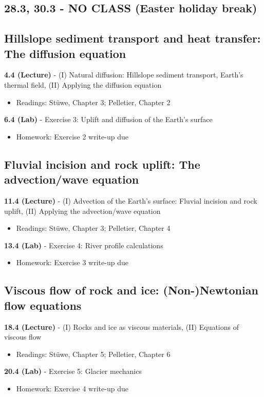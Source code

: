 \documentclass[11pt,a4paper]{article}
\begin{document}
\subsection*{28.3, 30.3 - NO CLASS (Easter holiday break)}

\subsection*{Hillslope sediment transport and heat transfer: The diffusion equation}
\textbf{4.4 (Lecture)} - (I) Natural diffusion: Hillslope sediment transport, Earth's thermal field, (II) Applying the diffusion equation
\begin{itemize}
  \item Readings: St\"{u}we, Chapter 3; Pelletier, Chapter 2
\end{itemize}
\textbf{6.4 (Lab)} - Exercise 3: Uplift and diffusion of the Earth's surface
\begin{itemize}
  \item Homework: Exercise 2 write-up due
\end{itemize}

\subsection*{Fluvial incision and rock uplift: The advection/wave equation}
\textbf{11.4 (Lecture)} - (I) Advection of the Earth's surface: Fluvial incision and rock uplift, (II) Applying the advection/wave equation
\begin{itemize}
  \item Readings: St\"{u}we, Chapter 3; Pelletier, Chapter 4
\end{itemize}
\textbf{13.4 (Lab)} - Exercise 4: River profile calculations
\begin{itemize}
  \item Homework: Exercise 3 write-up due
\end{itemize}

\subsection*{Viscous flow of rock and ice: (Non-)Newtonian flow equations}
\textbf{18.4 (Lecture)} - (I) Rocks and ice as viscous materials, (II) Equations of viscous flow
\begin{itemize}
  \item Readings: St\"{u}we, Chapter 5; Pelletier, Chapter 6
\end{itemize}
\textbf{20.4 (Lab)} - Exercise 5: Glacier mechanics
\begin{itemize}
  \item Homework: Exercise 4 write-up due
\end{itemize}
\end{document}
